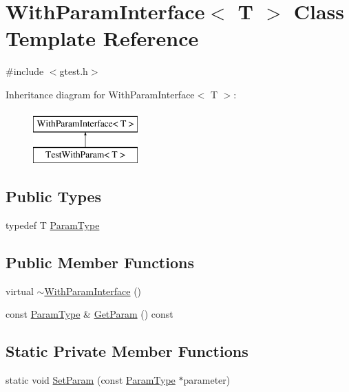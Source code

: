 \hypertarget{classtesting_1_1WithParamInterface}{\section{\-With\-Param\-Interface$<$ \-T $>$ \-Class \-Template \-Reference}
\label{d5/d86/classtesting_1_1WithParamInterface}
}


{\ttfamily \#include $<$gtest.\-h$>$}

\-Inheritance diagram for \-With\-Param\-Interface$<$ \-T $>$\-:\begin{figure}[H]
\begin{center}
\leavevmode
\includegraphics[height=2.000000cm]{d5/d86/classtesting_1_1WithParamInterface}
\end{center}
\end{figure}
\subsection*{\-Public \-Types}
\begin{DoxyCompactItemize}
\item 
typedef \-T \hyperlink{classtesting_1_1WithParamInterface_a1c17d95e5946c3f940ece2bd9165fc34}{\-Param\-Type}
\end{DoxyCompactItemize}
\subsection*{\-Public \-Member \-Functions}
\begin{DoxyCompactItemize}
\item 
virtual \hyperlink{classtesting_1_1WithParamInterface_a8f0b6bb3a8944a138dd44325def16893}{$\sim$\-With\-Param\-Interface} ()
\item 
const \hyperlink{classtesting_1_1WithParamInterface_a1c17d95e5946c3f940ece2bd9165fc34}{\-Param\-Type} \& \hyperlink{classtesting_1_1WithParamInterface_ab02cb909f49768046368b2e7d5e261e0}{\-Get\-Param} () const 
\end{DoxyCompactItemize}
\subsection*{\-Static \-Private \-Member \-Functions}
\begin{DoxyCompactItemize}
\item 
static void \hyperlink{classtesting_1_1WithParamInterface_a3fc459e276b5e0e5191e7db788f5271f}{\-Set\-Param} (const \hyperlink{classtesting_1_1WithParamInterface_a1c17d95e5946c3f940ece2bd9165fc34}{\-Param\-Type} $\ast$parameter)
\end{DoxyCompactItemize}
